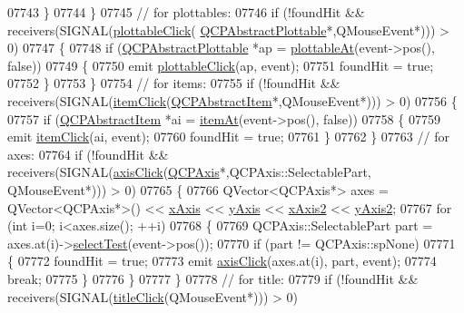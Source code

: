 \begin{DoxyCode}
07743       \}
07744     \}
07745     \textcolor{comment}{// for plottables:}
07746     \textcolor{keywordflow}{if} (!foundHit && receivers(SIGNAL(\hyperlink{a00116_a57e5efa8a854620e9bf62d31fc139f53}{plottableClick}(
      \hyperlink{a00024}{QCPAbstractPlottable}*,QMouseEvent*))) > 0)
07747     \{
07748       \textcolor{keywordflow}{if} (\hyperlink{a00024}{QCPAbstractPlottable} *ap = \hyperlink{a00116_ac1d1bc6ae4e13616fb02cef6d9e2188e}{plottableAt}(event->pos(), \textcolor{keyword}{false}))
07749       \{
07750         emit \hyperlink{a00116_a57e5efa8a854620e9bf62d31fc139f53}{plottableClick}(ap, event);
07751         foundHit = \textcolor{keyword}{true};
07752       \}
07753     \}
07754     \textcolor{comment}{// for items:}
07755     \textcolor{keywordflow}{if} (!foundHit && receivers(SIGNAL(\hyperlink{a00116_ae16b51f52d2b7aebbc7e3e74e6ff2e4b}{itemClick}(\hyperlink{a00022}{QCPAbstractItem}*,QMouseEvent*))) > 
      0)
07756     \{
07757       \textcolor{keywordflow}{if} (\hyperlink{a00022}{QCPAbstractItem} *ai = \hyperlink{a00116_a793e4b04e0ede11a733021907368fa83}{itemAt}(event->pos(), \textcolor{keyword}{false}))
07758       \{
07759         emit \hyperlink{a00116_ae16b51f52d2b7aebbc7e3e74e6ff2e4b}{itemClick}(ai, event);
07760         foundHit = \textcolor{keyword}{true};
07761       \}
07762     \}
07763     \textcolor{comment}{// for axes:}
07764     \textcolor{keywordflow}{if} (!foundHit && receivers(SIGNAL(\hyperlink{a00116_abf635f8b56ab5c16d5de9f358543e82b}{axisClick}(\hyperlink{a00025}{QCPAxis}*,QCPAxis::SelectablePart,
      QMouseEvent*))) > 0)
07765     \{
07766       QVector<QCPAxis*> axes = QVector<QCPAxis*>() << \hyperlink{a00116_a384438707adbcc96b0fa1324106f7129}{xAxis} << \hyperlink{a00116_af168096ce67002b1fbce18ae5dd1b652}{yAxis} << 
      \hyperlink{a00116_a058f6d3a4c86bf94c476e5c380711dba}{xAxis2} << \hyperlink{a00116_a4fd6679232da7da0a1ae4e1b6ae83d6e}{yAxis2};
07767       \textcolor{keywordflow}{for} (\textcolor{keywordtype}{int} i=0; i<axes.size(); ++i)
07768       \{
07769         QCPAxis::SelectablePart part = axes.at(i)->\hyperlink{a00025_a940be5ef61f4fa0dc21e4f4c7a5875c2}{selectTest}(event->pos());
07770         \textcolor{keywordflow}{if} (part != QCPAxis::spNone)
07771         \{
07772           foundHit = \textcolor{keyword}{true};
07773           emit \hyperlink{a00116_abf635f8b56ab5c16d5de9f358543e82b}{axisClick}(axes.at(i), part, event);
07774           \textcolor{keywordflow}{break};
07775         \}
07776       \}
07777     \}
07778     \textcolor{comment}{// for title:}
07779     \textcolor{keywordflow}{if} (!foundHit && receivers(SIGNAL(\hyperlink{a00116_a969beb5e4b7e8864e5e349fcda4ce45b}{titleClick}(QMouseEvent*))) > 0)

\end{DoxyCode}
